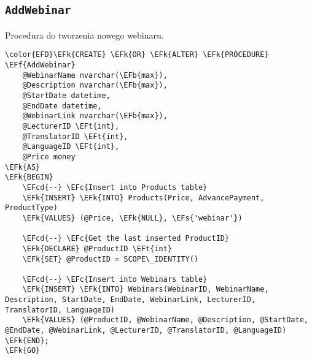 \documentclass[11pt]{article}
\newcommand{\EFc}[1]{\textcolor{EFc}{\textit{#1}}} %
\newcommand{\EFcd}[1]{\textcolor{EFcd}{\textit{#1}}} %
\newcommand{\EFs}[1]{\textcolor{EFs}{#1}} %
\newcommand{\EFk}[1]{\textcolor{EFk}{\textbf{#1}}} %
\newcommand{\EFb}[1]{\textcolor{EFb}{\textbf{#1}}} %
\newcommand{\EFf}[1]{\textcolor{EFf}{#1}} %
\newcommand{\EFt}[1]{\textcolor{EFt}{\textbf{#1}}} %
\begin{document}
\subsection{\texttt{AddWebinar}}
\label{sec:orgc662948}
Procedura do tworzenia nowego webinaru.
\begin{Code}
\begin{Verbatim}
\color{EFD}\EFk{CREATE} \EFk{OR} \EFk{ALTER} \EFk{PROCEDURE} \EFf{AddWebinar}
    @WebinarName nvarchar(\EFb{max}),
    @Description nvarchar(\EFb{max}),
    @StartDate datetime,
    @EndDate datetime,
    @WebinarLink nvarchar(\EFb{max}),
    @LecturerID \EFt{int},
    @TranslatorID \EFt{int},
    @LanguageID \EFt{int},
    @Price money
\EFk{AS}
\EFk{BEGIN}
    \EFcd{--} \EFc{Insert into Products table}
    \EFk{INSERT} \EFk{INTO} Products(Price, AdvancePayment, ProductType)
    \EFk{VALUES} (@Price, \EFk{NULL}, \EFs{'webinar'})

    \EFcd{--} \EFc{Get the last inserted ProductID}
    \EFk{DECLARE} @ProductID \EFt{int}
    \EFk{SET} @ProductID = SCOPE\_IDENTITY()

    \EFcd{--} \EFc{Insert into Webinars table}
    \EFk{INSERT} \EFk{INTO} Webinars(WebinarID, WebinarName, Description, StartDate, EndDate, WebinarLink, LecturerID, TranslatorID, LanguageID)
    \EFk{VALUES} (@ProductID, @WebinarName, @Description, @StartDate, @EndDate, @WebinarLink, @LecturerID, @TranslatorID, @LanguageID)
\EFk{END};
\EFk{GO}
\end{Verbatim}
\end{Code}
\end{document}
